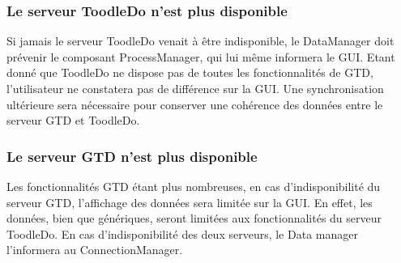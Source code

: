 \subsubsection*{Le serveur ToodleDo n'est plus disponible}

Si jamais le serveur ToodleDo venait à être indisponible, le DataManager
doit prévenir le composant ProcessManager, qui lui même informera le GUI.
Etant donné que ToodleDo ne dispose pas de toutes les fonctionnalités de GTD,
l'utilisateur ne constatera pas de différence sur la GUI. Une synchronisation
ultérieure sera nécessaire pour conserver une cohérence des données entre le
serveur GTD et ToodleDo.

\subsubsection*{Le serveur GTD n'est plus disponible}
Les fonctionnalités GTD étant plus nombreuses, en cas d'indisponibilité du
serveur GTD, l'affichage des données sera limitée sur la GUI. En effet, les
données, bien que génériques, seront limitées aux fonctionnalités du serveur
ToodleDo. En cas d'indisponibilité des deux serveurs, le Data manager
l'informera au ConnectionManager.
